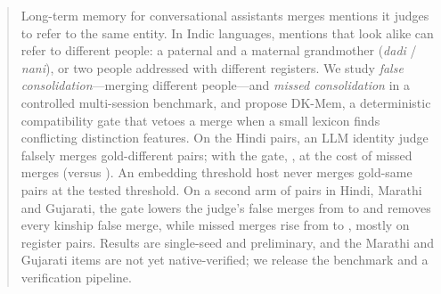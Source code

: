 \begin{abstract}
Long-term memory for conversational assistants merges mentions it judges to refer to the same entity. In Indic languages, mentions that look
alike can refer to different people: a paternal and a maternal grandmother (\emph{dadi} / \emph{nani}), or two people addressed with different
registers. We study \emph{false consolidation}---merging different people---and \emph{missed consolidation} in a controlled multi-session
benchmark, and propose DK-Mem, a deterministic compatibility gate that vetoes a merge when a small lexicon finds conflicting distinction
features. On the Hindi pairs, an LLM identity judge falsely merges \MainCoffHiFCR{} gold-different pairs; with the gate, \MainClexHiFCR{},
at the cost of \MainClexHiMCR{} missed merges (versus \MainCoffHiMCR{}). An embedding threshold host never merges gold-same pairs at the
tested threshold. On a second arm of \VTwoNPairs{} pairs in Hindi, Marathi and Gujarati, the gate lowers the judge's false merges from
\VTwoCOffFCR{} to \VTwoCLexFCR{} and removes every kinship false merge, while missed merges rise from \VTwoCOffMCR{} to \VTwoCLexMCR{},
mostly on register pairs. Results are single-seed and preliminary, and the Marathi and Gujarati items are not yet native-verified; we
release the benchmark and a verification pipeline. 
\end{abstract}
